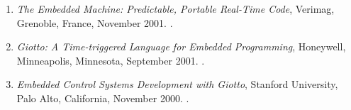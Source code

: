 {\begin{enumerate}
\item \emph{The Embedded Machine: Predictable, Portable Real-Time Code},
Verimag, Grenoble, France, November 2001.
.

\item \emph{Giotto: A Time-triggered Language for Embedded Programming},
Honeywell, Minneapolis, Minnesota, September 2001.
.

\item \emph{Embedded Control Systems Development with Giotto},
Stanford University, Palo Alto, California, November 2000.
.
\end{enumerate}
}